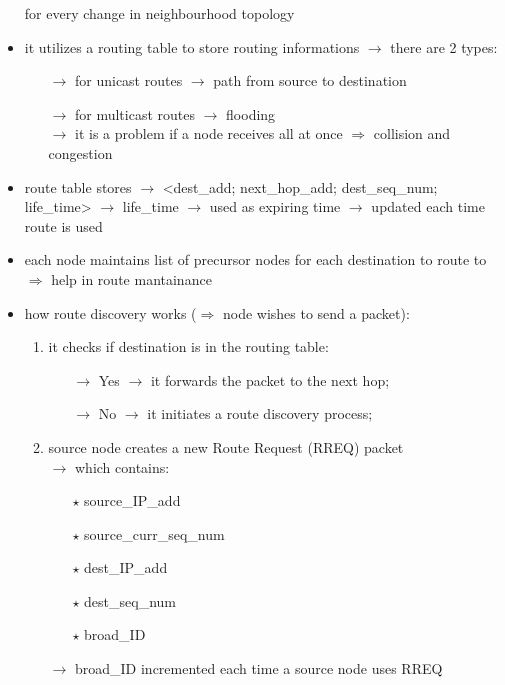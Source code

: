 \begin{itemize}
        for every change in neighbourhood topology
    \item it utilizes a routing table to store routing informations $\rightarrow$ there are 2 types:
    \begin{itemize}
        \item[$\rightarrow$] for unicast routes $\rightarrow$ path from source to destination
        \item[$\rightarrow$] for multicast routes $\rightarrow$ flooding\\
        $\rightarrow$ it is a problem if a node receives all at once $\Rightarrow$ collision and congestion
    \end{itemize}
    \item route table stores $\rightarrow$ <dest\_add; next\_hop\_add; dest\_seq\_num; life\_time>
    $\rightarrow$ life\_time $\rightarrow$ used as expiring time $\rightarrow$ updated each time route is used
    \item each node maintains list of precursor nodes for each destination to route to\\$\Rightarrow$ help in route mantainance
    \newpage
    \item how route discovery works ($\Rightarrow$ node wishes to send a packet):
    \begin{enumerate}
        \item it checks if destination is in the routing table:
        \begin{itemize}
            \item[$\rightarrow$] Yes $\rightarrow$ it forwards the packet to the next hop;
            \item[$\rightarrow$] No $\rightarrow$ it initiates a route discovery process;
        \end{itemize}
        \item source node creates a new Route Request (RREQ) packet\\
        $\rightarrow$ which contains:
        \begin{itemize}
            \item[$\star$] source\_IP\_add
            \item[$\star$] source\_curr\_seq\_num
            \item[$\star$] dest\_IP\_add
            \item[$\star$] dest\_seq\_num
            \item[$\star$] broad\_ID
        \end{itemize}
        $\rightarrow$ broad\_ID incremented each time a source node uses RREQ

\end{enumerate}
\end{itemize}
